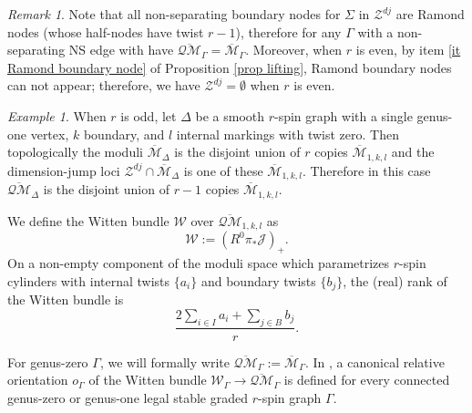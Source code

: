 \documentclass[11pt]{amsart}
\theoremstyle{definition}
\theoremstyle{remark}
\newtheorem{rmk}[dummy]{Remark}
\newtheorem{ex}[dummy]{Example}
\newcommand{\oQMb}{{\overline{\mathcal{QM}}}}
\newcommand{\<}{\left<}
\renewcommand{\>}{\right>}
\numberwithin{equation}{section}
\def\Mbar{{\overline{\mathcal M}}}
\begin{document}
\begin{rmk}\label{rmk dim jump non separating}
    Note that all non-separating boundary nodes for $\Sigma$ in $\mathcal Z^{dj}$ are Ramond nodes (whose half-nodes have twist $r-1$), therefore for any $\Gamma$ with a non-separating NS edge with have $\oQMb_{\Gamma}=\Mbar_{\Gamma}$.     
   Moreover, when $r$ is even, %
by item \ref{it Ramond boundary node} of Proposition \ref{prop lifting}, Ramond %
boundary nodes can not appear; therefore, we have $\mathcal Z^{dj}=\emptyset$ when $r$ is even.
\end{rmk}



\begin{ex}
    When $r$ is odd, let $\Delta$ be a smooth $r$-spin graph with a single genus-one vertex, %
$k$ boundary, and %
$l$ internal markings with twist zero. Then topologically the moduli $\Mbar_\Delta$ is the disjoint union of $r$ copies  $\Mbar_{1,k,l}$ and the dimension-jump loci $\mathcal Z^{dj}\cap\Mbar_\Delta$ is one of these $\Mbar_{1,k,l}$. Therefore in this case $\oQMb_\Delta$ is the disjoint union of $r-1$ copies  $\Mbar_{1,k,l}$.
\end{ex}

We define the Witten  bundle  $\mathcal W$ over $\oQMb_{1,k,l}$ as 
$${\mathcal{W}}:= (R^0\pi_*\mathcal{J})_+.$$
On a non-empty component of the moduli space which parametrizes $r$-spin cylinders with internal twists $\{a_i\}$ and boundary twists $\{b_j\}$, the (real) rank of the Witten bundle is
\begin{equation}\label{eq rank of witten bundle g=1}\frac{2 \sum_{i\in I} a_i + \sum_{j\in B} b_j }{r}.\end{equation}



For genus-zero $\Gamma$, we will formally write $\oQMb_\Gamma:=\Mbar_{\Gamma}$. 
In \cite[\S 3.2]{TZ1}, a canonical relative orientation $o_\Gamma$ of the Witten bundle $\mathcal W_\Gamma \to \oQMb_\Gamma$ is defined for every connected genus-zero or genus-one legal stable graded $r$-spin graph $\Gamma$.
\end{document}
